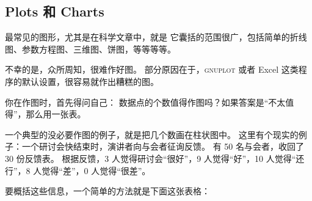 \subsection{Plots 和 Charts}

\bohs

最常见的图形，尤其是在科学文章中，就是
它囊括的范围很广，包括简单的折线图、参数方程图、三维图、饼图，等等等等。

不幸的是，众所周知，很难作好图。
部分原因在于，\textsc{gnuplot} 或者 Excel 这类程序的默认设置，很容易就作出糟糕的图。

你在作图时，首先得问自己：
数据点的个数值得作图吗？如果答案是“不太值得”，那么用一张表。

一个典型的没必要作图的例子，就是把几个数画在柱状图中。
这里有个现实的例子：一个研讨会快结束时，演讲者向与会者征询反馈。
有 50 名与会者，收回了 30 份反馈表。
根据反馈，3 人觉得研讨会“很好”，9 人觉得“好”，10 人觉得“还行”，8 人觉得“差”，0 人觉得“很差”。

要概括这些信息，一个简单的方法就是下面这张表格：

\eohs

